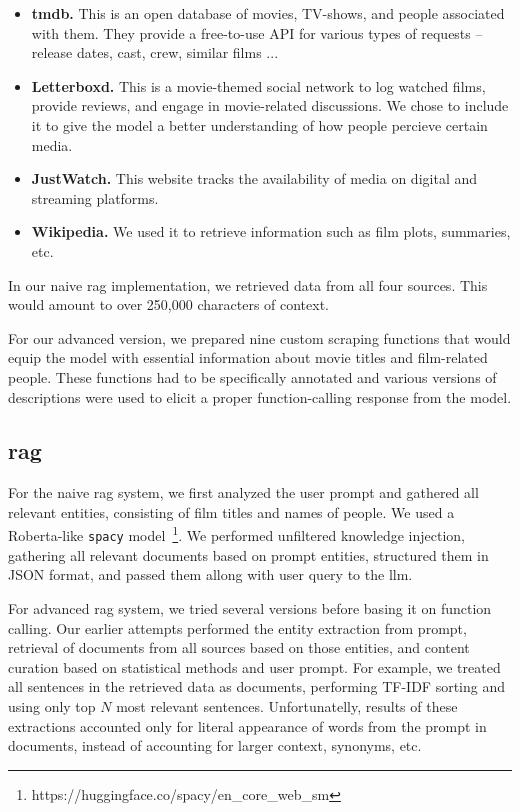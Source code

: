 \documentclass[fleqn,moreauthors,10pt]{ds_report}
\begin{document}
\begin{itemize}
	\item \textbf{\ac{tmdb}.} This is an open database of movies, TV-shows, and people associated with them. They provide a free-to-use API for various types of requests -- release dates, cast, crew, similar films ...
	\item \textbf{Letterboxd.} This is a movie-themed social network to log watched films, provide reviews, and engage in movie-related discussions. We chose to include it to give the model a better understanding of how people percieve certain media.
	\item \textbf{JustWatch.} This website tracks the availability of media on digital and streaming platforms.
	\item \textbf{Wikipedia.} We used it to retrieve information such as film plots, summaries, etc.
\end{itemize}

In our naive \ac{rag} implementation, we retrieved data from all four sources. This would amount to over 250,000 characters of context.

For our advanced version, we prepared nine custom scraping functions that would equip the model with essential information about movie titles and film-related people. These functions had to be specifically annotated and various versions of descriptions were used to elicit a proper function-calling response from the model.

\subsection*{\ac{rag}}

For the naive \ac{rag} system, we first analyzed the user prompt and gathered all relevant entities, consisting of film titles and names of people. We used a Roberta-like \texttt{spacy} model~\footnote{https://huggingface.co/spacy/en\_core\_web\_sm}. We performed unfiltered knowledge injection, gathering all relevant documents based on prompt entities, structured them in JSON format, and passed them allong with user query to the \ac{llm}.

For advanced \ac{rag} system, we tried several versions before basing it on function calling. Our earlier attempts performed the entity extraction from prompt, retrieval of documents from all sources based on those entities, and content curation based on statistical methods and user prompt. For example, we treated all sentences in the retrieved data as documents, performing TF-IDF sorting and using only top $N$ most relevant sentences. Unfortunatelly, results of these extractions accounted only for literal appearance of words from the prompt in documents, instead of accounting for larger context, synonyms, etc.
\end{document}
